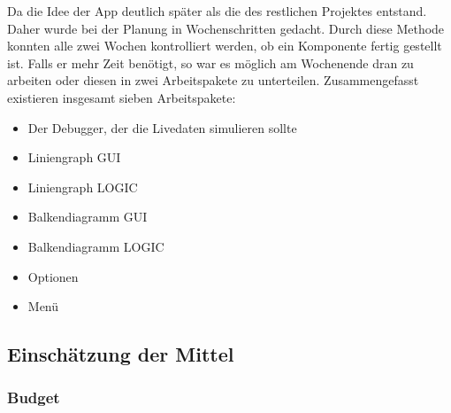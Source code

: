 Da die Idee der App deutlich später als die des restlichen Projektes entstand. Daher wurde bei der Planung in Wochenschritten gedacht. Durch diese Methode konnten alle zwei Wochen kontrolliert werden, ob ein Komponente fertig gestellt ist. Falls er mehr Zeit benötigt, so war es möglich am Wochenende dran zu arbeiten oder diesen in zwei Arbeitspakete zu unterteilen. Zusammengefasst existieren insgesamt sieben Arbeitspakete:
\begin{itemize}
	\item Der Debugger, der die Livedaten simulieren sollte
	\item Liniengraph GUI
	\item Liniengraph LOGIC
	\item Balkendiagramm GUI
	\item Balkendiagramm LOGIC
	\item Optionen
	\item Menü
\end{itemize}

\subsection{Einschätzung der Mittel}
\subsubsection{Budget}
\label{subsubsec:Budget}


